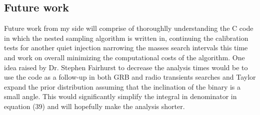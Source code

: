 \documentclass[epsf]{article}
\begin{document}
\subsection{Future work}
Future work from my side will comprise of thoroughlly understanding the C code in which the nested sampling algorithm is written in, continuing the calibration tests for another quiet injection narrowing the masses search intervals this time and work on overall minimizing the computational costs of the algorithm. One idea raised by Dr. Stephen Fairhurst to decrease the analysis times would be to use the code as a follow-up in both GRB and radio transients searches and Taylor expand the prior distribution assuming that the inclination of the binary is a small angle. This would significantly simplify the integral in denominator in equation (39) and will hopefully make the analysis shorter.       
\end{document}
